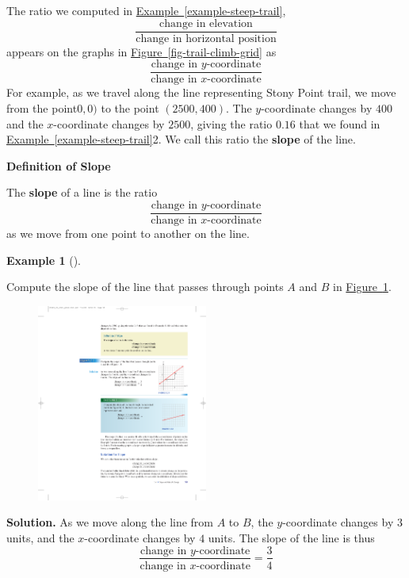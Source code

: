 \documentclass[10pt,]{book}
\newcommand{\terminology}[1]{\textbf{#1}}
\theoremstyle{plain}
\theoremstyle{definition}
\theoremstyle{definition}
\newtheorem{example}[theorem]{Example}
\theoremstyle{definition}
\theoremstyle{definition}
\numberwithin{equation}{section}
\begin{document}
    The ratio we computed in \hyperref[example-steep-trail]{Example~\ref{example-steep-trail}},
    \begin{equation*}\frac{\text{change in elevation}}{\text{change in horizontal position}}\end{equation*}  
    appears on the graphs in \hyperref[fig-trail-climb-grid]{Figure~\ref{fig-trail-climb-grid}} as
    \begin{equation*}\frac{\text{change in }y\text{-coordinate}}{\text{change in }x\text{-coordinate}}\end{equation*} 
    For example, as we travel along the line representing Stony Point trail, we move from the point\(0, 0)\) to the point \((2500, 400)\). The \(y\)-coordinate changes by \(400\) and the \(x\)-coordinate changes by \(2500\), giving the ratio \(0.16\) that we found in \hyperref[example-steep-trail]{Example~\ref{example-steep-trail}}2. We call this ratio the \terminology{slope} of the line.
%
\begin{mdframed}[style=assemblage]%
\noindent\textbf{\large Definition of Slope}\label{assemblage-9}\par\medskip
The \terminology{slope} of a line is the ratio
    \begin{equation*}\frac{\text{change in }y\text{-coordinate}}{\text{change in }x\text{-coordinate}}\end{equation*} 
    as we move from one point to another on the line.
\end{mdframed}
\begin{example}[]\label{example-slope-grid}

    Compute the slope of the line that passes through points \(A\) and \(B\) in \hyperref[fig-slope-grid]{Figure~\ref{fig-slope-grid}}.
%
\leavevmode%
\begin{figure}
\centering
\includegraphics[width=0.50\textwidth,]{images/fig-slope-grid.pdf}\caption{\label{fig-slope-grid}}
\end{figure}
\par\medskip\noindent%
\textbf{Solution.}\quad 
    As we move along the line from \(A\) to \(B\), the \(y\)-coordinate changes by \(3\) units, and the \(x\)-coordinate changes by \(4\) units. The slope of the line is thus
    \begin{equation*}\frac{\text{change in }y\text{-coordinate}}{\text{change in }x\text{-coordinate}}=\frac{3}{4}\end{equation*}\end{example}
\end{document}
